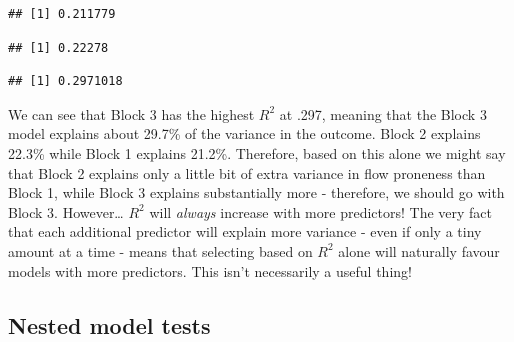 \documentclass[
]{book}
\newenvironment{Shaded}{\begin{snugshade}}{\end{snugshade}}
\newcommand{\FunctionTok}[1]{\textcolor[rgb]{0.13,0.29,0.53}{\textbf{#1}}}
\newcommand{\NormalTok}[1]{#1}
\newcommand{\SpecialCharTok}[1]{\textcolor[rgb]{0.81,0.36,0.00}{\textbf{#1}}}
\begin{document}
\begin{Shaded}
\end{Shaded}

\begin{verbatim}
## [1] 0.211779
\end{verbatim}

\begin{Shaded}
\end{Shaded}

\begin{verbatim}
## [1] 0.22278
\end{verbatim}

\begin{Shaded}
\end{Shaded}

\begin{verbatim}
## [1] 0.2971018
\end{verbatim}

We can see that Block 3 has the highest \(R^2\) at .297, meaning that the Block 3 model explains about 29.7\% of the variance in the outcome. Block 2 explains 22.3\% while Block 1 explains 21.2\%. Therefore, based on this alone we might say that Block 2 explains only a little bit of extra variance in flow proneness than Block 1, while Block 3 explains substantially more - therefore, we should go with Block 3. However\ldots{} \(R^2\) will \emph{always} increase with more predictors! The very fact that each additional predictor will explain more variance - even if only a tiny amount at a time - means that selecting based on \(R^2\) alone will naturally favour models with more predictors. This isn't necessarily a useful thing!

\subsection{Nested model tests}\label{nested-model-tests}
\end{document}
